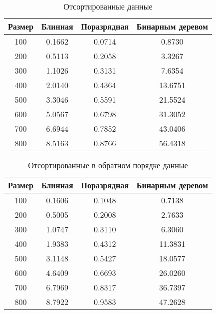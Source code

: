 \begin{table}[h]
	\begin{center}
		\begin{threeparttable}
		\captionsetup{justification=raggedleft,singlelinecheck=off}
		\caption{Отсортированные данные}
		\label{tbl:best}
		\begin{tabular}{|c|c|c|c|}
			\hline
			Размер & Блинная &  Поразрядная &  Бинарным деревом \\
			\hline
			100 & 0.1662 & 0.0714 & 0.8730 \\ 
			\hline
			200 & 0.5113 & 0.2058 & 3.3267 \\ 
			\hline
			300 & 1.1026 & 0.3131 & 7.6354 \\ 
			\hline
			400 & 2.0140 & 0.4364 & 13.6751 \\ 
			\hline
			500 & 3.3046 & 0.5591 & 21.5524 \\ 
			\hline
			600 & 5.0567 & 0.6798 & 31.3052 \\ 
			\hline
			700 & 6.6944 & 0.7852 & 43.0406 \\ 
			\hline
			800 & 8.5163 & 0.8766 & 56.4318 \\ 
			\hline
		\end{tabular}
		\end{threeparttable}
    \end{center}
\end{table}


\begin{table}[h]
	\begin{center}
		\begin{threeparttable}
		\captionsetup{justification=raggedleft,singlelinecheck=off}
		\caption{Отсортированные в обратном порядке данные}
		\label{tbl:worth}
		\begin{tabular}{|c|c|c|c|}
			\hline
			Размер & Блинная &  Поразрядная &  Бинарным деревом \\
			\hline
			100 & 0.1606 & 0.1048 & 0.7138 \\ 
			\hline
			200 & 0.5005 & 0.2008 & 2.7633 \\ 
			\hline
			300 & 1.0747 & 0.3110 & 6.3060 \\ 
			\hline
			400 & 1.9383 & 0.4312 & 11.3831 \\ 
			\hline
			500 & 3.1148 & 0.5427 & 18.0577 \\ 
			\hline
			600 & 4.6409 & 0.6693 & 26.0260 \\ 
			\hline
			700 & 6.7969 & 0.8317 & 36.7397 \\ 
			\hline
			800 & 8.7922 & 0.9583 & 47.2628 \\ 
			\hline
		\end{tabular}
		\end{threeparttable}
    \end{center}
\end{table}



